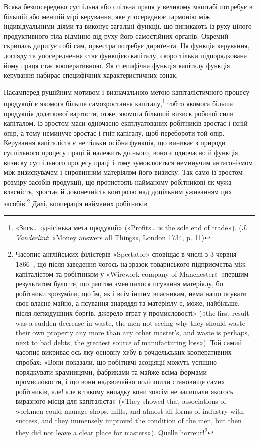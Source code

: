 Всяка безпосередньо суспільна або спільна праця у великому
маштабі потребує в більшій або меншій мірі керування, яке упосереднює
гармонію між індивідуальними діями та виконує загальні
функції, що виникають із руху цілого продуктивного тіла
відмінно від руху його самостійних органів. Окремий скрипаль
дириґує собі сам, оркестра потребує дириґента. Ця функція
керування, догляду та упосереднення стає функцією капіталу,
скоро тільки підпорядкована йому праця стає кооперативною.
Як специфічна функція капіталу функція керування набирає
специфічних характеристичних ознак.

Насамперед рушійним мотивом і визначальною метою капіталістичного
процесу продукції є якомога більше самозростання
капіталу,\footnote{
«Зиск\dots{} однісінька мета продукції» («Profits\dots{} is the sole end
of trade»). (\emph{J. Vanderlint}: «Money answers all Things», London 1734,
p. 11)
} тобто якомога більша продукція додаткової вартости,
отже, якомога більший визиск робочої сили капіталом. Із зростом
маси одночасно експлуатованих робітників зростає і їхній
опір, а тому неминуче зростає і гніт капіталу, щоб перебороти
той опір. Керування капіталіста є не тільки осібна функція, що
виникає з природи суспільного процесу праці й належить до нього,
воно є одночасно й функція визиску суспільного процесу праці
і тому зумовлюється неминучим антагонізмом між визискувачем
і сировинним матеріялом його визиску. Так само із зростом розміру
засобів продукції, що протистоять найманому робітникові
як чужа власність, зростає й доконечність контролю над доцільним
уживанням цих засобів.\footnote{
Часопис англійських філістерів «Spectator» сповіщає в числі
з 3 червня 1866~, що після заведення чогось на зразок товариського підприємства
між капіталістом та робітником у «Wirework company of Manchester»
«першим результатом було те, що раптом зменшилося псування
матеріялу, бо робітники зрозуміли, що їм, як і всім іншим власникам,
нема нащо псувати своє власне майно, а псування знаряддя та матеріялу
є, може, найбільше, після легкодушних боргів, джерело втрат у промисловості»
(«the first result was a sudden decrease in waste, the men not seeing
why they should waste their own property any more than any other master’s,
and waste is perhaps, next to bad debts, the greatest source of manufacturing
loss»). Той самий часопис викриває ось яку основну хибу в рочдельських кооперативних
спробах: «Вони показали, що робітничі асоціяції можуть
успішно порядкувати крамницями, фабриками та майже всіма формами
промисловости, і що вони надзвичайно поліпшили становище самих робітників,
але! але в такому випадку вони зовсім не залишали якогось виразного
місця для капіталіста» («They showed that associations of workmen
could manage shops, mills, and almost all forms of industry with success,
and they immensely improved the condition of the men, but then they did
not leave a clear place for masters»). Quelle horreur!\footnote*{
Який жах! \emph{Ред.}
}
} Далі, кооперація найманих робітників
